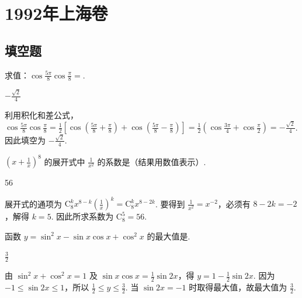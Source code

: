 \chapter{1992年上海卷}
\section{填空题}

\begin{problem}
求值：\(\cos \frac{5\pi}{8}\cos \frac{\pi}{8}=\)\fillinblank{}.
\end{problem}

\begin{answer}
\(-\frac{\sqrt{2}}{4}\)
\end{answer}

\begin{solution}
利用积化和差公式，\(\cos \frac{5\pi}{8}\cos \frac{\pi}{8}=\frac{1}{2}\left[\cos\left(\frac{5\pi}{8}+\frac{\pi}{8}\right)+\cos\left(\frac{5\pi}{8}-\frac{\pi}{8}\right)\right]=\frac{1}{2}\left(\cos\frac{3\pi}{4}+\cos\frac{\pi}{2}\right)=-\frac{\sqrt{2}}{4}\). 因此填空为 \(-\frac{\sqrt{2}}{4}\).
\end{solution}

\begin{problem}
\(\left(x + \frac{1}{x}\right)^8\) 的展开式中 \(\frac{1}{x^2}\) 的系数是\fillinblank{}（结果用数值表示）.
\end{problem}

\begin{answer}
56
\end{answer}

\begin{solution}
展开式的通项为 \(\mathrm C_8^k x^{8-k}\left(\frac{1}{x}\right)^k=\mathrm C_8^k x^{8-2k}\). 要得到 \(\frac{1}{x^2}=x^{-2}\)，必须有 \(8-2k=-2\)，解得 \(k=5\). 因此所求系数为 \(\mathrm C_8^5=56\).
\end{solution}

\begin{problem}
函数 \(y = \sin^2 x - \sin x \cos x + \cos^2 x\) 的最大值是\fillinblank{}.
\end{problem}

\begin{answer}
\(\frac{3}{2}\)
\end{answer}

\begin{solution}
由 \(\sin^2x+\cos^2x=1\) 及 \(\sin x\cos x=\frac{1}{2}\sin 2x\)，得 \(y=1-\frac{1}{2}\sin 2x\). 因为 \(-1\leqslant\sin 2x\leqslant1\)，所以 \(\frac{1}{2}\leqslant y\leqslant\frac{3}{2}\). 当 \(\sin 2x=-1\) 时取得最大值，故最大值为 \(\frac{3}{2}\).
\end{solution}


